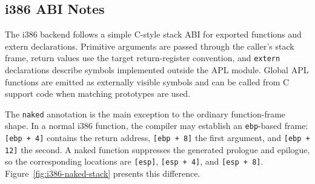 \documentclass[10pt,twocolumn]{article}
\begin{document}
\subsection{i386 ABI Notes}
\label{sec:i386-abi}

\par The i386 backend follows a simple C-style stack ABI for exported functions and extern declarations. Primitive arguments are passed through the caller's stack frame, return values use the target return-register convention, and \texttt{extern} declarations describe symbols implemented outside the APL module. Global APL functions are emitted as externally visible symbols and can be called from C support code when matching prototypes are used.
\par The \texttt{naked} annotation is the main exception to the ordinary function-frame shape. In a normal i386 function, the compiler may establish an \texttt{ebp}-based frame: \texttt{[ebp + 4]} contains the return address, \texttt{[ebp + 8]} the first argument, and \texttt{[ebp + 12]} the second. A naked function suppresses the generated prologue and epilogue, so the corresponding locations are \texttt{[esp]}, \texttt{[esp + 4]}, and \texttt{[esp + 8]}. Figure~\ref{fig:i386-naked-stack} presents this difference.
\end{document}
